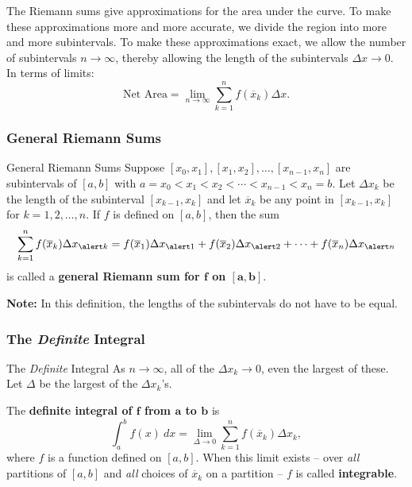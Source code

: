 \documentclass[cal1spr16Lectures.tex]{subfiles}
\begin{document}

\begin{frame}%
\small
The Riemann sums give approximations for the area under the curve.  To make these approximations more and more accurate, we divide the region into more and more subintervals.  To make these approximations exact, we allow the number of subintervals $n \to \infty$, thereby allowing the length of the subintervals $\Delta x \to 0$.  In terms of limits:
\[
\text{Net Area}=\lim_{n \to \infty} \sum_{k=1}^n f(\overline{x}_k) \Delta x.
\]
\end{frame}

\subsubsection{General Riemann Sums}

\begin{frame}{\small General Riemann Sums}\footnotesize
Suppose $[x_0,x_1], [x_1,x_2], \dots, [x_{n-1},x_n]$ are subintervals of $[a,b]$ with $a=x_0 < x_1 < x_2 < \cdots < x_{n-1} < x_n=b$.  Let $\Delta x_k$ be the length of the subinterval $[x_{k-1},x_k]$ and let $\overline{x}_k$ be any point in $[x_{k-1},x_k]$ for $k=1,2,\dots,n$.  If $f$ is defined on $[a,b]$, then the sum
\[
\sum_{k=1}^n f(\overline{x}_k) \Delta x_{\alert k} = f(\overline{x}_1)\Delta x_{\alert 1} + f(\overline{x}_2)\Delta x_{\alert 2} + \dots + f(\overline{x}_n)\Delta x_{\alert n}
\]
is called a {\bf general Riemann sum for $\boldsymbol{f}$ on $\boldsymbol{[a,b]}$}.

\vspace{0.5pc}
{\bf Note:} In this definition, the lengths of the subintervals do not have to be equal.
\end{frame}

\subsubsection{The {\it Definite} Integral}

\begin{frame}{\small The {\it Definite} Integral}\footnotesize
As $n \to \infty$, all of the $\Delta x_k \to 0$, even the largest of these.  Let $\Delta$ be the largest of the $\Delta x_k$'s.  %
%
\begin{dfn} The {\bf definite integral of $\boldsymbol{f}$ from $\boldsymbol{a}$ to $\boldsymbol{b}$} is
\[
\int_a^b f(x)\ dx = \lim_{\Delta  \to 0} \sum_{k=1}^n f(\overline{x}_k) \Delta x_k,
\]
where $f$ is a function defined on $[a,b]$.  When this limit exists -- over {\it all} partitions of $[a,b]$ and {\it all} choices of $\overline{x}_k$ on a partition -- $f$ is called {\bf integrable}. 
\end{dfn}
\end{frame}
\end{document}
